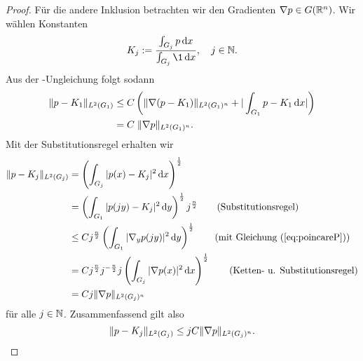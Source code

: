 \begin{proof}
  Für die andere Inklusion betrachten wir den Gradienten $\nabla p \in G(\mathbb{R}^n)$.
  Wir wählen Konstanten 
  $$
  K_j := \frac{\int_{G_j} p \d x}{\int_{G_j} \1 \d x}, \quad j \in \N.
  $$
  Aus der \poincare\hyp{}Ungleichung \cite[S.44, Lemma 1.1.2]{sohr2001navier} folgt sodann
  \begin{align}
  \lVert p - K_1 \rVert_{L^2(G_1)} &\leq C \left(\lVert \nabla (p - K_1) \rVert_{L^2(G_1)^n} + | \int_{G_1} p - K_1 \, {\operatorname{d}\!{x}} |\right) \nonumber\\
    \label{eq:poincareP}
  &=  C \;\lVert \nabla p \rVert_{L^2(G_1)^n}.
\end{align}
  Mit der Substitutionsregel erhalten wir
\begin{align*}
  \norm{p - K_j}_{L^2(G_j)} 
  &= \left( \int_{G_j} |p(x) - K_j|^2 \d x \right)^\frac{1}{2} \\
  &= \left( \int_{G_1} |p(jy) - K_j|^2 \d y \right)^\frac{1}{2} j^\frac{n}{2} \tag{Substitutionsregel}\\
  &\leq C j^{\frac{n}{2}}\left( \int_{G_1} |\nabla_y p(jy) |^2 \d y \right)^{\frac{1}{2}} \tag{mit Gleichung (\ref{eq:poincareP})}\\
  &= C j^{\frac{n}{2}}j^{-\frac{n}{2}}j \left( \int_{G_j} |\nabla p(x) |^2 \d x \right)^{\frac{1}{2}} \tag{Ketten- u. Substitutionsregel} \\
  &= C j \norm{\nabla p}_{L^2(G_j)^n}
\end{align*}
  für alle $j \in \mathbb{N}$.
  Zusammenfassend gilt also
  \begin{equation}
    \label{eq:gradientInequality}
    \lVert p - K_j \rVert_{L^2(G_j)} \leq j C\lVert \nabla p \rVert_{L^2(G_j)^n}.
  \end{equation}


\end{proof}
